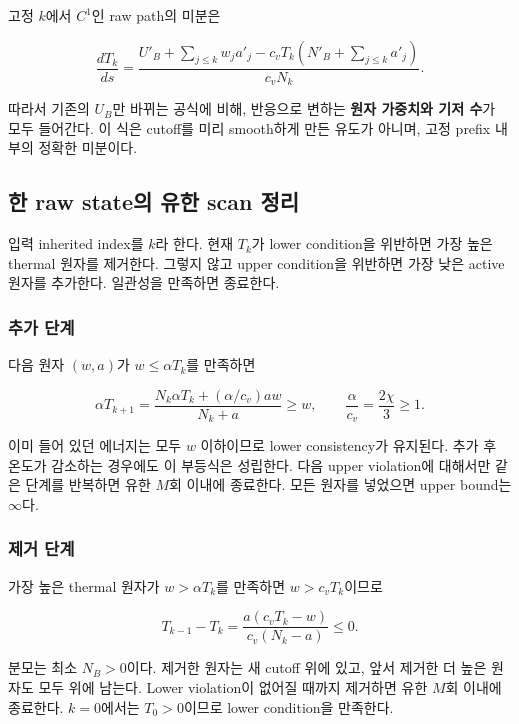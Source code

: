 고정 \(k\)에서 \(C^1\)인 raw path의 미분은

\[\frac{dT_k}{ds}=\frac{U'_B+\sum_{j\le k}w_ja'_j-c_vT_k(N'_B+\sum_{j\le k}a'_j)}{c_vN_k}.\tag{RB.4}\]

따라서 기존의 \(U_B\)만 바뀌는 공식에 비해, 반응으로 변하는 \textbf{원자 가중치와 기저 수}가 모두 들어간다. 이 식은 cutoff를 미리 smooth하게 만든 유도가 아니며, 고정 prefix 내부의 정확한 미분이다.

\hypertarget{uxd55c-raw-stateuxc758-uxc720uxd55c-scan-uxc815uxb9ac}{%
\subsection{한 raw state의 유한 scan 정리}\label{uxd55c-raw-stateuxc758-uxc720uxd55c-scan-uxc815uxb9ac}}

입력 inherited index를 \(k\)라 한다. 현재 \(T_k\)가 lower condition을 위반하면 가장 높은 thermal 원자를 제거한다. 그렇지 않고 upper condition을 위반하면 가장 낮은 active 원자를 추가한다. 일관성을 만족하면 종료한다.

\hypertarget{uxcd94uxac00-uxb2e8uxacc4}{%
\subsubsection{추가 단계}\label{uxcd94uxac00-uxb2e8uxacc4}}

다음 원자 \((w,a)\)가 \(w\le\alpha T_k\)를 만족하면

\[\alpha T_{k+1}=\frac{N_k\alpha T_k+(\alpha/c_v)aw}{N_k+a}\ge w,\qquad\frac\alpha{c_v}=\frac{2\chi}3\ge1.\tag{RB.5}\]

이미 들어 있던 에너지는 모두 \(w\) 이하이므로 lower consistency가 유지된다. 추가 후 온도가 감소하는 경우에도 이 부등식은 성립한다. 다음 upper violation에 대해서만 같은 단계를 반복하면 유한 \(M\)회 이내에 종료한다. 모든 원자를 넣었으면 upper bound는 \(\infty\)다.

\hypertarget{uxc81cuxac70-uxb2e8uxacc4}{%
\subsubsection{제거 단계}\label{uxc81cuxac70-uxb2e8uxacc4}}

가장 높은 thermal 원자가 \(w>\alpha T_k\)를 만족하면 \(w>c_vT_k\)이므로

\[T_{k-1}-T_k=\frac{a(c_vT_k-w)}{c_v(N_k-a)}\le0.\tag{RB.6}\]

분모는 최소 \(N_B>0\)이다. 제거한 원자는 새 cutoff 위에 있고, 앞서 제거한 더 높은 원자도 모두 위에 남는다. Lower violation이 없어질 때까지 제거하면 유한 \(M\)회 이내에 종료한다. \(k=0\)에서는 \(T_0>0\)이므로 lower condition을 만족한다.

